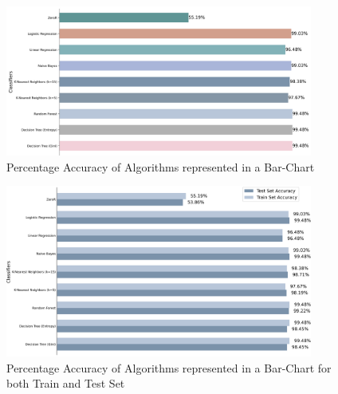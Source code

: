 \documentclass{article}
\begin{document}
    \begin{minipage}{\textwidth}
        \begin{figure}[H]
            \centering
            \includegraphics[width=0.9\textwidth]{images/bar_chart.png}
            \caption{Percentage Accuracy of Algorithms represented in a Bar-Chart}
            \vspace{0.1em}
            \label{acc1}
        \end{figure}
        \begin{figure}[H]
            \centering
            \includegraphics[width=0.9\textwidth]{images/classifier_accuracy_horizontal.png}
            \caption{Percentage Accuracy of Algorithms represented in a Bar-Chart for both Train and Test Set}
            \vspace{0.1em}
           \label{acc2}
        \end{figure}
    \end{minipage}
\end{document}
